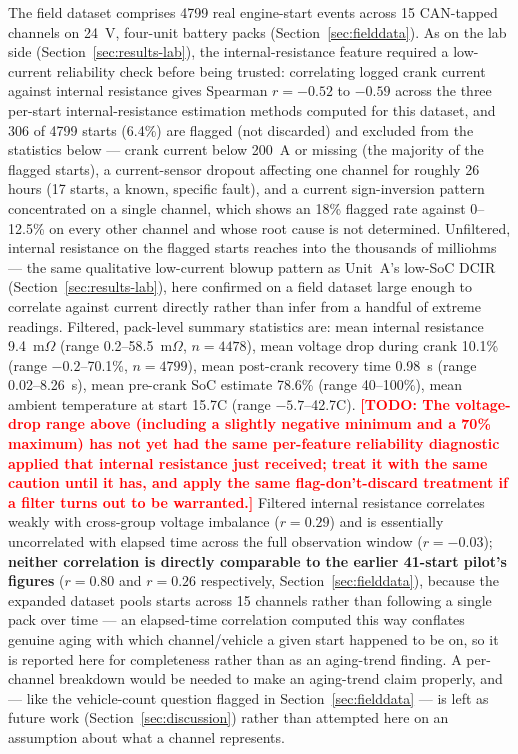 \documentclass[conference]{IEEEtran}
\newcommand{\todo}[1]{\textcolor{red}{\textbf{[TODO: #1]}}}
\begin{document}
The field dataset comprises 4799 real engine-start events across 15 CAN-tapped channels on 24~V, four-unit battery packs (Section~\ref{sec:fielddata}). As on the lab side (Section~\ref{sec:results-lab}), the internal-resistance feature required a low-current reliability check before being trusted: correlating logged crank current against internal resistance gives Spearman $r=-0.52$ to $-0.59$ across the three per-start internal-resistance estimation methods computed for this dataset, and 306 of 4799 starts (6.4\%) are flagged (not discarded) and excluded from the statistics below --- crank current below 200~A or missing (the majority of the flagged starts), a current-sensor dropout affecting one channel for roughly 26 hours (17 starts, a known, specific fault), and a current sign-inversion pattern concentrated on a single channel, which shows an 18\% flagged rate against 0--12.5\% on every other channel and whose root cause is not determined. Unfiltered, internal resistance on the flagged starts reaches into the thousands of milliohms --- the same qualitative low-current blowup pattern as Unit~A's low-SoC DCIR (Section~\ref{sec:results-lab}), here confirmed on a field dataset large enough to correlate against current directly rather than infer from a handful of extreme readings. Filtered, pack-level summary statistics are: mean internal resistance 9.4~m$\Omega$ (range 0.2--58.5~m$\Omega$, $n=4478$), mean voltage drop during crank 10.1\% (range $-0.2$--70.1\%, $n=4799$), mean post-crank recovery time 0.98~s (range 0.02--8.26~s), mean pre-crank SoC estimate 78.6\% (range 40--100\%), mean ambient temperature at start 15.7\textdegree{}C (range $-5.7$--42.7\textdegree{}C). \todo{The voltage-drop range above (including a slightly negative minimum and a 70\% maximum) has not yet had the same per-feature reliability diagnostic applied that internal resistance just received; treat it with the same caution until it has, and apply the same flag-don't-discard treatment if a filter turns out to be warranted.} Filtered internal resistance correlates weakly with cross-group voltage imbalance ($r=0.29$) and is essentially uncorrelated with elapsed time across the full observation window ($r=-0.03$); \textbf{neither correlation is directly comparable to the earlier 41-start pilot's figures} ($r=0.80$ and $r=0.26$ respectively, Section~\ref{sec:fielddata}), because the expanded dataset pools starts across 15 channels rather than following a single pack over time --- an elapsed-time correlation computed this way conflates genuine aging with which channel/vehicle a given start happened to be on, so it is reported here for completeness rather than as an aging-trend finding. A per-channel breakdown would be needed to make an aging-trend claim properly, and --- like the vehicle-count question flagged in Section~\ref{sec:fielddata} --- is left as future work (Section~\ref{sec:discussion}) rather than attempted here on an assumption about what a channel represents.
\end{document}
